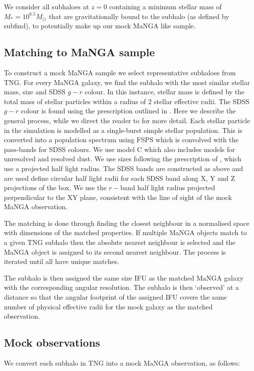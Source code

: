 \documentclass[fleqn,usenatbib]{mnras}
\begin{document}
We consider all subhaloes at $z=0$ containing a minimum stellar mass of $M_{\ast} = 10^{8.5} M_{\odot}$ that are gravitationally bound to the subhalo (as defined by subfind), to potentially make up our mock MaNGA like sample. 

\subsection{Matching to MaNGA sample}
To construct a mock MaNGA sample we select representative subhaloes from TNG. For every MaNGA galaxy, we find the subhalo with the most similar stellar mass, size and SDSS $g - r$ colour. In this instance, stellar mass is defined by the total mass of stellar particles within a radius of 2 stellar effective radii. The SDSS $g - r$ colour is found using the prescription outlined in \citet{nelson18}. Here we describe the general process, while we direct the reader to \citet{nelson18} for more detail. Each stellar particle in the simulation is modelled as a single-burst simple stellar population. This is converted into a population spectrum using FSPS \citep{conroy2009,conroy2010,foreman_mackey2014} which is convolved with the pass-bands for SDSS colours. We use model C \citep[as described in][]{nelson18} which also includes models for unresolved and resolved dust. We use sizes following the prescription of \citet{genel2018}, which use a projected half light radius. The SDSS bands are constructed as above and are used define circular half light radii for each SDSS band along X, Y and Z projections of the box. We use the $r-$band half light radius projected perpendicular to the XY plane, consistent with the line of sight of the mock MaNGA observation.

The matching is done through finding the closest neighbour in a normalised space with dimensions of the matched properties. If multiple MaNGA objects match to a given TNG subhalo then the absolute nearest neighbour is selected and the MaNGA object is assigned to its second nearest neighbour. The process is iterated until all have unique matches. 

The subhalo is then assigned the same size IFU as the matched MaNGA galaxy with the corresponding angular resolution. The subhalo is then `observed' at a distance so that the angular footprint of the assigned IFU covers the same number of physical effective radii for the mock galaxy as the matched observation. 

\subsection{Mock observations}
We convert each subhalo in TNG into a mock MaNGA observation, as follows:
\end{document}
